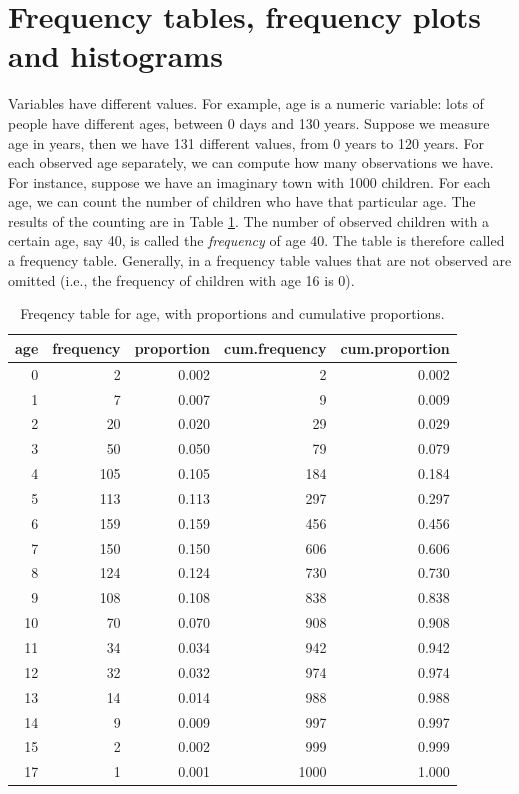 \documentclass[]{book}\usepackage[]{graphicx}\usepackage[]{color}
\begin{document}
\section{Frequency tables, frequency plots and histograms}

Variables have different values. For example, age is a numeric variable: lots of people have different ages, between 0 days and 130 years. Suppose we measure age in years, then we have 131 different values, from 0 years to 120 years. For each observed age separately, we can compute how many observations we have. For instance, suppose we have an imaginary town with 1000 children. For each age, we can count the number of children who have that particular age. The results of the counting are in Table \ref{tab:frequency_1}. The number of observed children with a certain age, say 40, is called the \textit{frequency} of age 40. The table is therefore called a frequency table. Generally, in a frequency table values that are not observed are omitted (i.e., the frequency of children with age 16 is 0).

\begin{table}[ht]
\centering
\caption{Freqency table for age, with proportions and cumulative proportions.} 
\label{tab:frequency_1}
\begin{tabular}{rrrrr}
  \hline
age & frequency & proportion & cum.frequency & cum.proportion \\ 
  \hline
   0 &    2 & 0.002 &    2 & 0.002 \\ 
     1 &    7 & 0.007 &    9 & 0.009 \\ 
     2 &   20 & 0.020 &   29 & 0.029 \\ 
     3 &   50 & 0.050 &   79 & 0.079 \\ 
     4 &  105 & 0.105 &  184 & 0.184 \\ 
     5 &  113 & 0.113 &  297 & 0.297 \\ 
     6 &  159 & 0.159 &  456 & 0.456 \\ 
     7 &  150 & 0.150 &  606 & 0.606 \\ 
     8 &  124 & 0.124 &  730 & 0.730 \\ 
     9 &  108 & 0.108 &  838 & 0.838 \\ 
    10 &   70 & 0.070 &  908 & 0.908 \\ 
    11 &   34 & 0.034 &  942 & 0.942 \\ 
    12 &   32 & 0.032 &  974 & 0.974 \\ 
    13 &   14 & 0.014 &  988 & 0.988 \\ 
    14 &    9 & 0.009 &  997 & 0.997 \\ 
    15 &    2 & 0.002 &  999 & 0.999 \\ 
    17 &    1 & 0.001 & 1000 & 1.000 \\ 
   \hline
\end{tabular}
\end{table}
\end{document}
